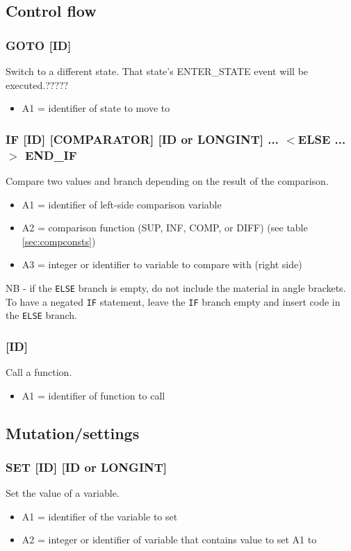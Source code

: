 \documentclass[12pt,a4paper]{scrbook}
\begin{document}
\subsection{Control flow}

\subsubsection{GOTO [ID]}
Switch to a different state.  That state's ENTER\_STATE event will be executed.?????
\begin{itemize}
\item A1 = identifier of state to move to
\end{itemize}

\subsubsection{IF [ID] [COMPARATOR] [ID or LONGINT] ... $<$ELSE ...$>$ END\_IF }
Compare two values and branch depending on the result of the comparison.
\begin{itemize}
\item A1 = identifier of left-side comparison variable
\item A2 = comparison function (SUP, INF, COMP, or DIFF) (see table \ref{sec:compconsts})
\item A3 = integer or identifier to variable to compare with (right side)
\end{itemize}
NB - if the \texttt{ELSE} branch is empty, do not include the material in angle brackets.
To have a negated \texttt{IF} statement, leave the \texttt{IF} branch empty and insert
code in the \texttt{ELSE} branch.

\subsubsection{[ID]}
Call a function.
\begin{itemize}
\item A1 = identifier of function to call
\end{itemize}


\subsection{Mutation/settings}

\subsubsection{SET [ID] [ID or LONGINT]}
Set the value of a variable.
\begin{itemize}
\item A1 = identifier of the variable to set
\item A2 = integer or identifier of variable that contains value to set A1 to
\end{itemize}
\end{document}
